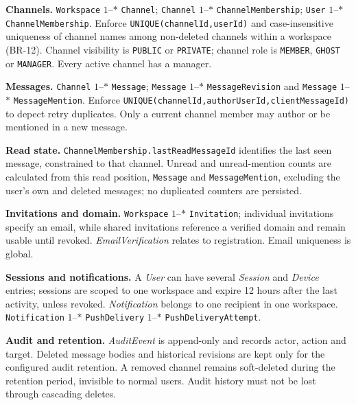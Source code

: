 \documentclass[
    english, %
]{VUMIFPSkursinis}
\begin{document}
\textbf{Channels.} \texttt{Workspace} $1$--$*$ \texttt{Channel}; \texttt{Channel} $1$--$*$ \texttt{ChannelMembership}; \texttt{User} $1$--$*$ \texttt{ChannelMembership}. Enforce \texttt{UNIQUE(channelId,userId)} and case-insensitive uniqueness of channel names among non-deleted channels within a workspace (BR-12). Channel visibility is \texttt{PUBLIC} or \texttt{PRIVATE}; channel role is \texttt{MEMBER}, \texttt{GHOST} or \texttt{MANAGER}. Every active channel has a manager.

\textbf{Messages.} \texttt{Channel} $1$--$*$ \texttt{Message}; \texttt{Message} $1$--$*$ \texttt{MessageRevision} and \texttt{Message} $1$--$*$ \texttt{MessageMention}. Enforce \texttt{UNIQUE(channelId,authorUserId,clientMessageId)} to depect retry duplicates. Only a current channel member may author or be mentioned in a new message.

\textbf{Read state.} \texttt{ChannelMembership.lastReadMessageId} identifies the last seen message, constrained to that channel. Unread and unread-mention counts are calculated from this read position, \texttt{Message} and \texttt{MessageMention}, excluding the user's own and deleted messages; no duplicated counters are persisted.

\textbf{Invitations and domain.} \texttt{Workspace} $1$--$*$ \texttt{Invitation}; individual invitations specify an email, while shared invitations reference a verified domain and remain usable until revoked. \textit{EmailVerification} relates to registration. Email uniqueness is global.

\textbf{Sessions and notifications.} A \textit{User} can have several \textit{Session} and \textit{Device} entries; sessions are scoped to one workspace and expire 12 hours after the last activity, unless revoked. \textit{Notification} belongs to one recipient in one workspace. \texttt{Notification} $1$--$*$ \texttt{PushDelivery} $1$--$*$ \texttt{PushDeliveryAttempt}.

\textbf{Audit and retention.} \textit{AuditEvent} is append-only and records actor, action and target. Deleted message bodies and historical revisions are kept only for the configured audit retention. A removed channel remains soft-deleted during the retention period, invisible to normal users. Audit history must not be lost through cascading deletes.
\end{document}
